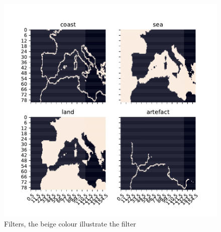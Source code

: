 \begin{figure}
    \centering
    \includegraphics{python_figs/filters.pdf}
    \caption{Filters, the beige colour illustrate the filter}
    \label{fig:filters_subplot}
\end{figure}

